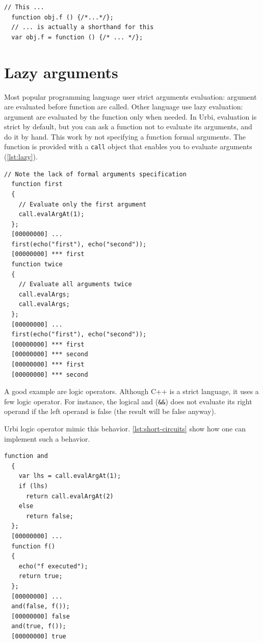 \documentclass[openright,twoside,12pt]{report}
\newcommand{\Cxx}{C++\xspace}
\newcommand{\urbi}{Urbi\xspace}
\newcommand{\lst}[1]{\autoref{lst:#1}}
\begin{document}
\begin{lstlisting}[caption=The function sugar,
  label=lst:function-sugar]
  // This ...
  function obj.f () {/*...*/};
  // ... is actually a shorthand for this
  var obj.f = function () {/* ... */};
\end{lstlisting}

\section{Lazy arguments}

Most popular programming language user strict arguments evaluation:
argument are evaluated before function are called. Other language use
lazy evaluation: argument are evaluated by the function only when
needed. In \urbi, evaluation is strict by default, but you can ask a
function not to evaluate its arguments, and do it by hand. This work
by not specifying a function formal arguments. The function is
provided with a \texttt{call} object that enables you to evaluate
arguments (\lst{lazy}).

\begin{lstlisting}[caption=Tweaking arguments evaluation,
  label=lst:lazy]
  // Note the lack of formal arguments specification
  function first
  {
    // Evaluate only the first argument
    call.evalArgAt(1);
  };
  [00000000] ...
  first(echo("first"), echo("second"));
  [00000000] *** first
  function twice
  {
    // Evaluate all arguments twice
    call.evalArgs;
    call.evalArgs;
  };
  [00000000] ...
  first(echo("first"), echo("second"));
  [00000000] *** first
  [00000000] *** second
  [00000000] *** first
  [00000000] *** second
\end{lstlisting}

A good example are logic operators. Although \Cxx is a strict
language, it uses a few logic operator. For instance, the logical and
(\texttt{\&\&}) does not evaluate its right operand if the left
operand is false (the result will be false anyway).

\urbi logic operator mimic this behavior. \lst{short-circuits} show
how one can implement such a behavior.

\begin{lstlisting}[caption=Implementing logic short circuits,
  label=lst:short-circuits]
  function and
  {
    var lhs = call.evalArgAt(1);
    if (lhs)
      return call.evalArgAt(2)
    else
      return false;
  };
  [00000000] ...
  function f()
  {
    echo("f executed");
    return true;
  };
  [00000000] ...
  and(false, f());
  [00000000] false
  and(true, f());
  [00000000] true
\end{lstlisting}
\end{document}
